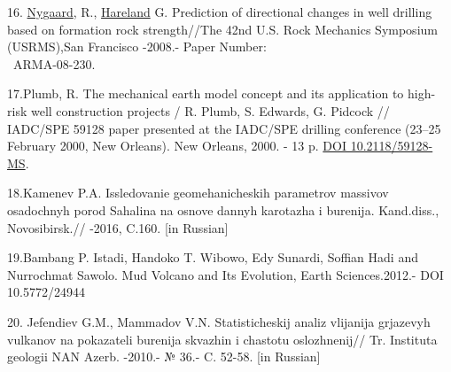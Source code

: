 \begin{references}
16. \href{javascript:;}{Nygaard}, R., \href{javascript:;}{Hareland} G.
Prediction of directional changes in well drilling based on formation
rock strength//The 42nd U.S. Rock Mechanics Symposium (USRMS),San
Francisco -2008.- Paper Number:\\~ARMA-08-230.

17.Plumb, R. The mechanical earth model concept and its application to
high-risk well construction projects / R. Plumb, S. Edwards, G. Pidcock
// IADC/SPE 59128 paper presented at the IADC/SPE drilling conference
(23--25 February 2000, New Orleans). New Orleans, 2000. - 13 p.
\href{https://doi.org/10.2118/59128-MS}{DOI 10.2118/59128-MS}.

18.Kamenev P.A. Issledovanie geomehanicheskih parametrov massivov
osadochnyh porod Sahalina na osnove dannyh karotazha i burenija.
Kand.diss., Novosibirsk.// -2016, C.160. {[}in Russian{]}

19.Bambang P. Istadi, Handoko T. Wibowo, Edy Sunardi, Soffian Hadi and
Nurrochmat Sawolo. Mud Volcano and Its Evolution, Earth Sciences.2012.-
DOI 10.5772/24944

20. Jefendiev G.M., Mammadov V.N. Statisticheskij analiz vlijanija
grjazevyh vulkanov na pokazateli burenija skvazhin i chastotu
oslozhnenij// Tr. Instituta geologii NAN Azerb. -2010.- № 36.- C. 52-58.
{[}in Russian{]}
\end{references}

